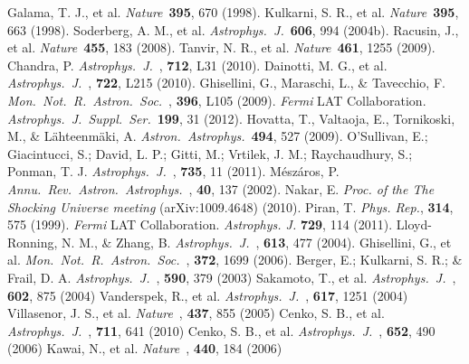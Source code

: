 \documentclass[12pt]{article}
\def\aap{{\it Astron.~Astrophys.}~}
\def\apj{{\it Astrophys.~J.}~}
\def\apjs{{\it Astrophys.~J.~Suppl.~Ser.}~}
\def\araa{{\it Annu.~Rev.~Astron.~Astrophys.}~}
\def\mnras{{\it Mon.~Not.~R.~Astron.~Soc.}~}
\def\nat{{\it Nature}~}
\begin{document}
\begin{thebibliography}{99}
 Galama, T. J., et al. \nat {\bf 395}, 670 (1998).	
 Kulkarni, S. R., et al. \nat {\bf 395}, 663 (1998).	
 Soderberg, A. M., et al. \apj {\bf 606}, 994 (2004b).	
 Racusin, J., et al. \nat {\bf 455}, 183 (2008).	
 Tanvir, N. R., et al. \nat {\bf 461}, 1255 (2009).	
 Chandra, P. \apj, {\bf 712}, L31 (2010).	
 Dainotti, M. G., et al. \apj, {\bf 722}, L215 (2010).	
 Ghisellini, G., Maraschi, L., \& Tavecchio, F. \mnras, {\bf 396}, L105 (2009).	
 \emph{Fermi} LAT Collaboration. \apjs  {\bf 199}, 31 (2012).		
 {Hovatta}, T., {Valtaoja}, E., {Tornikoski}, M., \& {L\"ahteenm\"aki}, A. \aap 	\textbf{494}, 527 (2009).	
 O'Sullivan, E.; Giacintucci, S.; David, L. P.; Gitti, M.; Vrtilek, J. M.; Raychaudhury, S.; Ponman, T. J. \apj, {\bf 735}, 11 (2011).	
 M\'esz\'aros, P. \araa, {\bf 40}, 137 (2002).	
 Nakar, E. \emph{Proc. of the The Shocking Universe meeting} (arXiv:1009.4648) (2010).	
 Piran, T.  \emph{Phys. Rep.}, {\bf 314}, 575 (1999).	
 \emph{Fermi} LAT Collaboration. \emph{Astrophys. J.} \textbf{729}, 114 (2011).	
 Lloyd-Ronning, N. M., \& Zhang, B. \apj, {\bf 613}, 477 (2004).	
 Ghisellini, G., et al. \mnras, {\bf 372}, 1699 (2006).	
 Berger, E.; Kulkarni, S. R.; \& Frail, D. A. \apj, {\bf 590}, 379 (2003)	
 Sakamoto, T., et al. \apj, {\bf 602}, 875 (2004)	
 Vanderspek, R., et al. \apj, {\bf 617}, 1251 (2004)	
 Villasenor, J. S., et al. \nat, {\bf 437}, 855 (2005)	
 Cenko, S. B., et al. \apj, {\bf 711}, 641 (2010)	
 Cenko, S. B., et al. \apj, {\bf 652}, 490 (2006)	
 Kawai, N., et al. \nat, {\bf 440}, 184 (2006)	

\end{thebibliography}
\end{document}
